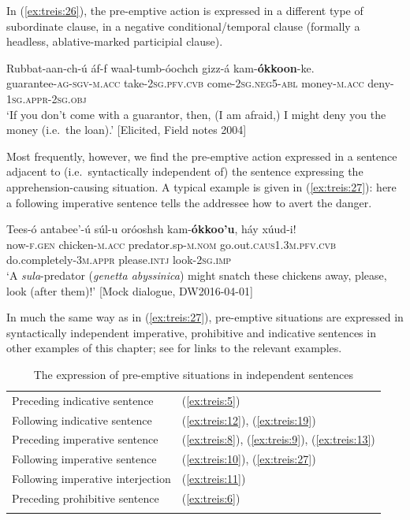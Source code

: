 \documentclass[output=paper,colorlinks,citecolor=brown,]{langscibook}
\begin{document}
In (\ref{ex:treis:26}), the pre-emptive action is expressed in a different type of subordinate clause, in a negative conditional\slash temporal clause (formally a headless, ablative-marked participial clause).

\ea\label{ex:treis:26} 
\gll Rubbat-aan-ch-ú 				áf-f 				waal-tumb-óochch gizz-á 			kam-\textbf{ókkoon}-ke. \\
guarantee-\textsc{ag-sgv-m.acc}	take-\textsc{2sg.pfv.cvb} come-\textsc{2sg.neg5-abl} money-\textsc{m.acc}	deny-\textsc{1sg.appr-2sg.obj}\\
\glt `If you don't come with a guarantor, then, (I am afraid,) I might deny you the money (i.e.\ the loan).'   [Elicited, Field notes 2004]
\z 

Most frequently, however, we find the pre-emptive action expressed in a sentence adjacent to (i.e.\ syntactically independent of) the sentence expressing the apprehension-causing situation. A typical example is given in (\ref{ex:treis:27}): here a following imperative sentence tells the addressee how to avert the danger.

\ea\label{ex:treis:27} 
\gll Tees-ó		antabee'-ú			súl-u						oróoshsh kam-\textbf{ókkoo'u}, 					háy			xúud-i! \\
now-\textsc{f.gen}	chicken-\textsc{m.acc}	predator.sp-\textsc{m.nom}	go.out.\textsc{caus1.3m.pfv.cvb} do.completely-\textsc{3m.appr}	please.\textsc{intj}	look-\textsc{2sg.imp}\\
\glt `A \textit{sula}-predator (\textit{genetta abyssinica}) might snatch these chickens away, please, look (after them)!' [Mock dialogue, DW2016-04-01]
\z 

In much the same way as in (\ref{ex:treis:27}), pre-emptive situations are expressed in syntactically independent imperative, prohibitive and indicative sentences in other examples of this chapter; see  for links to the relevant examples.

\begin{table}

    \begin{tabular}{ll}
    \lsptoprule
Preceding indicative sentence &	(\ref{ex:treis:5})\\
Following indicative sentence &	(\ref{ex:treis:12}), (\ref{ex:treis:19})\\
Preceding imperative sentence &	(\ref{ex:treis:8}), (\ref{ex:treis:9}), (\ref{ex:treis:13})\\
Following imperative sentence &	(\ref{ex:treis:10}), (\ref{ex:treis:27})\\
Following imperative interjection &	(\ref{ex:treis:11})\\
Preceding prohibitive sentence & (\ref{ex:treis:6})\\
\lspbottomrule
    \end{tabular}
    \caption{The expression of pre-emptive situations in independent sentences}
    \label{tab:treis:3}
\end{table}
\end{document}
